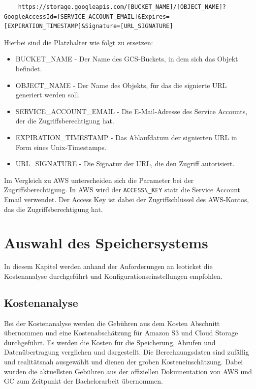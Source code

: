 \begin{lstlisting}
	https://storage.googleapis.com/[BUCKET_NAME]/[OBJECT_NAME]?GoogleAccessId=[SERVICE_ACCOUNT_EMAIL]&Expires=[EXPIRATION_TIMESTAMP]&Signature=[URL_SIGNATURE]
\end{lstlisting}

Hierbei sind die Platzhalter wie folgt zu ersetzen:

\begin{itemize}
	\item BUCKET\_NAME - Der Name des GCS-Buckets, in dem sich das Objekt befindet.
	\item OBJECT\_NAME - Der Name des Objekts, für das die signierte URL generiert werden soll.
	\item SERVICE\_ACCOUNT\_EMAIL - Die E-Mail-Adresse des Service Accounts, der die Zugriffsberechtigung hat.
	\item EXPIRATION\_TIMESTAMP - Das Ablaufdatum der signierten URL in Form eines Unix-Timestamps.
	\item URL\_SIGNATURE - Die Signatur der URL, die den Zugriff autorisiert.
\end{itemize}

Im Vergleich zu AWS unterscheiden sich die Parameter bei der Zugriffsberechtigung. In AWS wird der \verb|ACCESS\_KEY| statt die Service Account Email verwendet. Der Access Key ist dabei der Zugriffschlüssel des AWS-Kontos, das die Zugriffsberechtigung hat.

\newpage

\section{Auswahl des Speichersystems}

In diesem Kapitel werden anhand der Anforderungen an leoticket die Kostenanalyse durchgeführt und Konfigurationseinstellungen empfohlen.

\subsection{Kostenanalyse}

Bei der Kostenanalyse werden die Gebühren aus dem Kosten Abschnitt übernommen und eine Kostenabschätzung für Amazon S3 und Cloud Storage durchgeführt. Es werden die Kosten für die Speicherung, Abrufen und Datenübertragung verglichen und dargestellt. Die Berechnungsdaten sind zufällig und realitätsnah ausgewählt und dienen der groben Kosteneinschätzung. Dabei wurden die aktuellsten Gebühren aus der offiziellen Dokumentation von AWS und GC zum Zeitpunkt der Bachelorarbeit übernommen.\\

